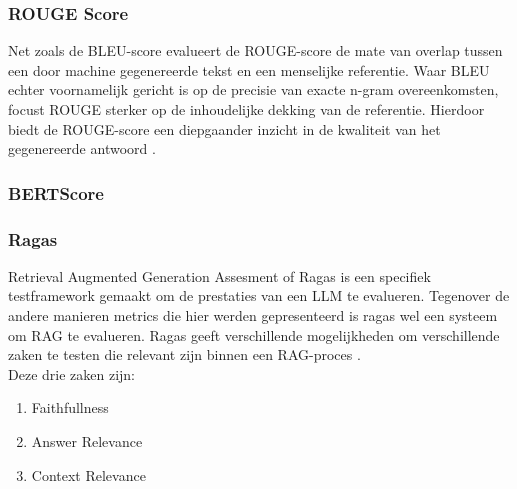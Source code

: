 \subsubsection{ROUGE Score}

Net zoals de BLEU-score evalueert de ROUGE-score de mate van overlap tussen een door machine gegenereerde tekst en een menselijke referentie. Waar BLEU echter voornamelijk gericht is op de precisie van exacte n-gram overeenkomsten, focust ROUGE sterker op de inhoudelijke dekking van de referentie. Hierdoor biedt de ROUGE-score een diepgaander inzicht in de kwaliteit van het gegenereerde antwoord \autocite{ganesan2018rouge20updatedimproved}.

\subsubsection{BERTScore}

\subsubsection{Ragas}

Retrieval Augmented Generation Assesment of Ragas is een specifiek testframework gemaakt om de prestaties van een LLM te evalueren. Tegenover de andere manieren metrics die hier werden gepresenteerd is ragas wel een systeem om RAG te evalueren. Ragas geeft verschillende mogelijkheden om verschillende zaken te testen die relevant zijn binnen een RAG-proces \autocite{Es2023}.
\\[1em]
Deze drie zaken zijn:
\begin{enumerate}
    \item Faithfullness
    \item Answer Relevance
    \item Context Relevance
\end{enumerate}

